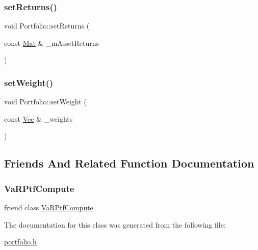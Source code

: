 \subsubsection{\texorpdfstring{set\+Returns()}{setReturns()}}
{\footnotesize\ttfamily void Portfolio\+::set\+Returns (\begin{DoxyParamCaption}\item[{const \hyperlink{compute__returns__eigen_8h_ae14dd28696f743e067dbd2594616bad6}{Mat} \&}]{\+\_\+m\+Asset\+Returns }\end{DoxyParamCaption})}

\hypertarget{classPortfolio_a0c05f8c7ae8bd78971524ed06a98deba}{}\label{classPortfolio_a0c05f8c7ae8bd78971524ed06a98deba} 
\subsubsection{\texorpdfstring{set\+Weight()}{setWeight()}}
{\footnotesize\ttfamily void Portfolio\+::set\+Weight (\begin{DoxyParamCaption}\item[{const \hyperlink{compute__returns__eigen_8h_a1eb6a9306ef406d7975f3cbf2e247777}{Vec} \&}]{\+\_\+weights }\end{DoxyParamCaption})}



\subsection{Friends And Related Function Documentation}
\hypertarget{classPortfolio_a6135a57a82e989f986dd94c3175bc07d}{}\label{classPortfolio_a6135a57a82e989f986dd94c3175bc07d} 
\subsubsection{\texorpdfstring{Va\+R\+Ptf\+Compute}{VaRPtfCompute}}
{\footnotesize\ttfamily friend class \hyperlink{classVaRPtfCompute}{Va\+R\+Ptf\+Compute}\hspace{0.3cm}{\ttfamily [friend]}}



The documentation for this class was generated from the following file\+:\begin{DoxyCompactItemize}
\item 
\hyperlink{portfolio_8h}{portfolio.\+h}\end{DoxyCompactItemize}

